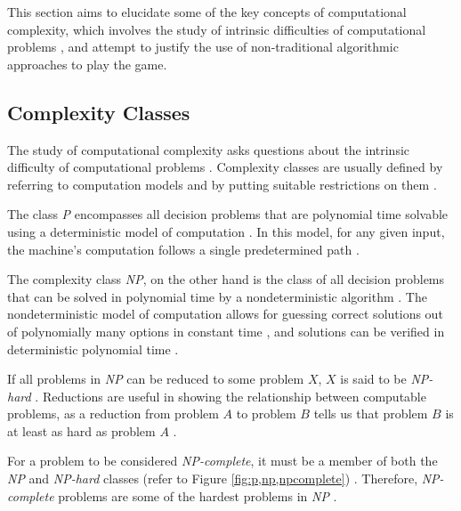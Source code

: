 \documentclass[a4paper, 12pt]{extreport}
\begin{document}
			This section aims to elucidate some of the key concepts of computational complexity, which involves the study of intrinsic difficulties of computational problems \cite{cc:conceptual-perspective}, and attempt to justify the use of non-traditional algorithmic approaches to play the game.
			
			\subsection{Complexity Classes}\label{subsec:compclass}
				
				The study of computational complexity asks questions about the intrinsic difficulty of computational problems \cite{cc:conceptual-perspective}. Complexity classes are usually defined by referring to computation models and by putting suitable restrictions on them \cite{uniform-cc}. 
				
				The class \textit{P} encompasses all decision problems that are polynomial time solvable using a deterministic model of computation \cite{cc:modern}. In this model, for any given input, the machine's computation follows a single predetermined path \cite{sipser-intro-to-computation}. 
				
				The complexity class \textit{NP}, on the other hand is the class of all decision problems that can be solved in polynomial time by a nondeterministic algorithm \cite{computers-and-intractability}. The nondeterministic model of computation allows for guessing correct solutions out of polynomially many options in constant time \cite{npcompleteness}, and solutions can be verified in deterministic polynomial time \cite{sipser-intro-to-computation}.
				
				If all problems in \textit{NP} can be reduced to some problem $X$, $X$ is said to be \textit{NP-hard} \cite{sipser-intro-to-computation}. Reductions are useful in showing the relationship between computable problems, as a reduction from problem $A$ to problem $B$ tells us that problem $B$ is at least as hard as problem $A$ \cite{npcompleteness}.
				
				For a problem to be considered \textit{NP-complete}, it must be a member of both the \textit{NP} and \textit{NP-hard} classes (refer to Figure \ref{fig:p,np,npcomplete}) \cite{npcompleteness}. Therefore, \textit{NP-complete} problems are some of the hardest problems in \textit{NP} \cite{cc:modern}.
				
\end{document}
